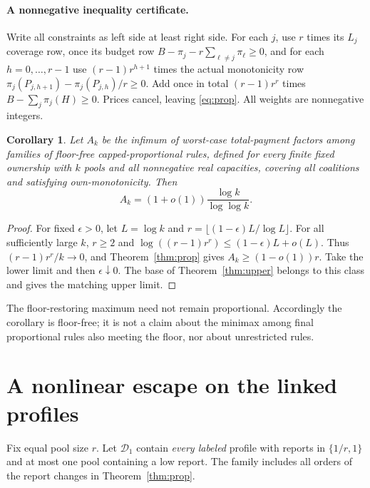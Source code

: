 \documentclass[11pt]{article}
\newtheorem{corollary}[theorem]{Corollary}
\theoremstyle{definition}\newtheorem{definition}[theorem]{Definition}
\theoremstyle{remark}\newtheorem{remark}[theorem]{Remark}
\begin{document}
\paragraph{A nonnegative inequality certificate.}
Write all constraints as left side at least right side. For each $j$, use
$r$ times its $L_j$ coverage row, once its budget row
$B-\pi_j-r\sum_{\ell\ne j}\pi_\ell\ge0$, and for each $h=0,\ldots,r-1$
use $(r-1)r^{h+1}$ times the actual monotonicity row
$\pi_j(P_{j,h+1})-\pi_j(P_{j,h})/r\ge0$. Add once in total
$(r-1)r^r$ times $B-\sum_j\pi_j(H)\ge0$. Prices cancel, leaving
\eqref{eq:prop}. All weights are nonnegative integers.

\begin{corollary}\label{cor:minimax}
Let $A_k$ be the infimum of worst-case total-payment factors among families
of floor-free capped-proportional rules, defined for every finite fixed
ownership with $k$ pools and all nonnegative real capacities, covering all
coalitions and satisfying own-monotonicity. Then
\[
 A_k=(1+o(1))\frac{\log k}{\log\log k}.
\]
\end{corollary}
\begin{proof}
For fixed $\epsilon>0$, let $L=\log k$ and
$r=\lfloor(1-\epsilon)L/\log L\rfloor$. For all sufficiently large $k$,
$r\ge2$ and
$\log((r-1)r^r)\le(1-\epsilon)L+o(L)$.
Thus $(r-1)r^r/k\to0$, and Theorem~\ref{thm:prop} gives
$A_k\ge(1-o(1))r$. Take the lower limit and then $\epsilon\downarrow0$.
The base of Theorem~\ref{thm:upper} belongs to this class and gives the
matching upper limit.
\end{proof}
The floor-restoring maximum need not remain proportional. Accordingly the
corollary is floor-free; it is not a claim about the minimax among final
proportional rules also meeting the floor, nor about unrestricted rules.

\section{A nonlinear escape on the linked profiles}\label{sec:escape}
Fix equal pool size $r$. Let $\mathcal D_1$ contain \emph{every labeled}
profile with reports in $\{1/r,1\}$ and at most one pool containing a low
report. The family includes all orders of the report changes in
Theorem~\ref{thm:prop}.
\end{document}
